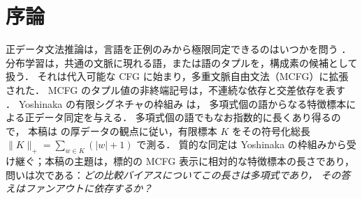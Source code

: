 \section{序論}
\label{sec:introduction}

正データ文法推論は，言語を正例のみから極限同定できるのはいつかを問う
\cite{Gold1967,Angluin1980}．
分布学習は，共通の文脈に現れる語，または語のタプルを，構成素の候補として扱う．
それは代入可能な
CFG \cite{ClarkEyraud2007,Yoshinaka2008} に始まり，多重文脈自由文法（MCFG）に拡張された．
MCFG のタプル値の非終端記号は，不連続な依存と交差依存を表す
\cite{SekiEtAl1991,Yoshinaka2009,Yoshinaka2011,Kallmeyer2010}．
Yoshinaka の有限シグネチャの枠組み \cite{Yoshinaka2015General} は，
多項式個の語からなる特徴標本による正データ同定を与える．
多項式個の語でもなお指数的に長くあり得るので，
本稿は \cite[Section~2.5.2]{EyraudHeinzYoshinaka2016} の厚データの観点に従い，有限標本 $K$ をその符号化総長
$\|K\|_+=\sum_{w\in K}(|w|+1)$ で測る．
質的な同定は
Yoshinaka の枠組みから受け継ぐ；本稿の主題は，標的の MCFG 表示に相対的な特徴標本の長さであり，
問いは次である：\emph{どの比較バイアスについてこの長さは多項式であり，
その答えはファンアウトに依存するか？}

